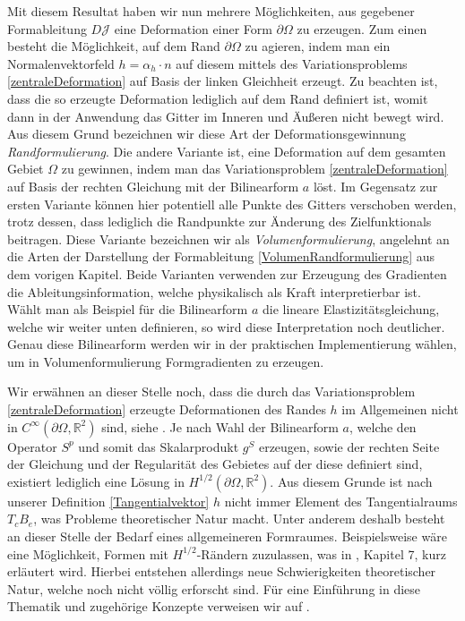 Mit diesem Resultat haben wir nun mehrere Möglichkeiten, aus gegebener Formableitung $D\mathcal{J}$ eine Deformation einer Form $\partial\Omega$ zu erzeugen. Zum einen besteht die Möglichkeit, auf dem Rand $\partial\Omega$ zu agieren, indem man ein Normalenvektorfeld $h = \alpha_h \cdot n$ auf diesem mittels des Variationsproblems \ref{zentraleDeformation} auf Basis der linken Gleichheit erzeugt. Zu beachten ist, dass die so erzeugte Deformation lediglich auf dem Rand definiert ist, womit dann in der Anwendung das Gitter im Inneren und Äußeren nicht bewegt wird. Aus diesem Grund bezeichnen wir diese Art der Deformationsgewinnung \textit{Randformulierung}. Die andere Variante ist, eine Deformation auf dem gesamten Gebiet $\Omega$ zu gewinnen, indem man das Variationsproblem \ref{zentraleDeformation} auf Basis der rechten Gleichung mit der Bilinearform 
$a$ löst. Im Gegensatz zur ersten Variante können hier potentiell alle Punkte des Gitters verschoben werden, trotz dessen, dass lediglich die Randpunkte zur Änderung des Zielfunktionals beitragen. Diese Variante bezeichnen wir als \textit{Volumenformulierung}, angelehnt an die Arten der Darstellung der Formableitung \ref{VolumenRandformulierung} aus dem vorigen Kapitel. Beide Varianten verwenden zur Erzeugung des Gradienten die Ableitungsinformation, welche physikalisch als Kraft interpretierbar ist. Wählt man als Beispiel für die Bilinearform $a$ die lineare Elastizitätsgleichung, welche wir weiter unten definieren, so wird diese Interpretation noch deutlicher. Genau diese Bilinearform werden wir in der praktischen Implementierung wählen, um in Volumenformulierung Formgradienten zu erzeugen.

Wir erwähnen an dieser Stelle noch, dass die durch das Variationsproblem \ref{zentraleDeformation} erzeugte Deformationen des Randes $h$ im Allgemeinen nicht in $C^\infty(\partial\Omega,\mathbb{R}^2)$ sind, siehe \cite{bfgs2}. Je nach Wahl der Bilinearform $a$, welche den Operator $S^p$ und somit das Skalarprodukt $g^S$ erzeugen, sowie der rechten Seite der Gleichung und der Regularität des Gebietes auf der diese definiert sind, existiert lediglich eine Lösung in $H^{1/2}(\partial\Omega,\mathbb{R}^2)$. Aus diesem Grunde ist nach unserer Definition \ref{Tangentialvektor} $h$ nicht immer Element des Tangentialraums $T_cB_e$, was Probleme theoretischer Natur macht. Unter anderem deshalb besteht an dieser Stelle der Bedarf eines allgemeineren Formraumes. Beispielsweise wäre eine Möglichkeit, Formen mit $H^{1/2}$-Rändern zuzulassen, was in \cite{shape_space}, Kapitel 7, kurz erläutert wird. Hierbei entstehen allerdings neue Schwierigkeiten theoretischer Natur, welche noch nicht völlig erforscht sind. Für eine Einführung in diese Thematik und zugehörige Konzepte verweisen wir auf \cite{diffeology}.

